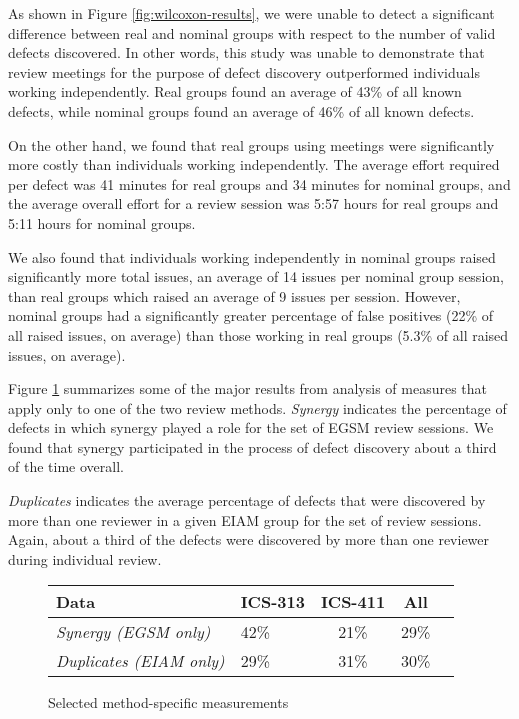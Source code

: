 As shown in Figure \ref{fig:wilcoxon-results}, we were unable to detect a
significant difference between real and nominal groups with respect to the
number of valid defects discovered. In other words, this study was unable
to demonstrate that review meetings for the purpose of defect discovery
outperformed individuals working independently.  Real groups found an
average of 43\% of all known defects, while nominal groups found an
average of 46\% of all known defects.

On the other hand, we found that real groups using meetings were
significantly more costly than individuals working independently.  The
average effort required per defect was 41 minutes for real groups and 34
minutes for nominal groups, and the average overall effort for a review
session was 5:57 hours for real groups and 5:11 hours for nominal groups.

We also found that individuals working independently in nominal groups
raised significantly more total issues, an average of 14 issues per nominal
group session, than real groups which raised an average of 9 issues per
session.  However, nominal groups had a significantly greater percentage of
false positives (22\% of all raised issues, on average) than those working
in real groups (5.3\% of all raised issues, on average). 

Figure \ref{fig:individual-results} summarizes some of the major results from
analysis of measures that apply only to one of the two review methods.
{\em Synergy} indicates the percentage of defects in which
synergy played a role for the set of EGSM review sessions. We found that
synergy participated in the process of defect discovery about a third
of the time overall. 

{\em Duplicates} indicates the average percentage of defects that were
discovered by more than one reviewer in a given EIAM group for the set of
review sessions. Again, about a third of the defects were discovered by 
more than one reviewer during individual review. 

\begin{figure}[ht]
\small
  \begin{center}
  \begin{tabular}{|l|l|c|c|c|}
   \hline
Data                       & ICS-313 & ICS-411 & All \\
   \hline
{\em Synergy (EGSM only)}         & 42\%    & 21\%     & 29\% \\
{\em Duplicates (EIAM only)}      & 29\%    & 31\%     & 30\% \\
  \hline
   \end{tabular}
  \end{center}
 \caption{Selected method-specific measurements}
 \label{fig:individual-results}
\normalsize
\end{figure}

